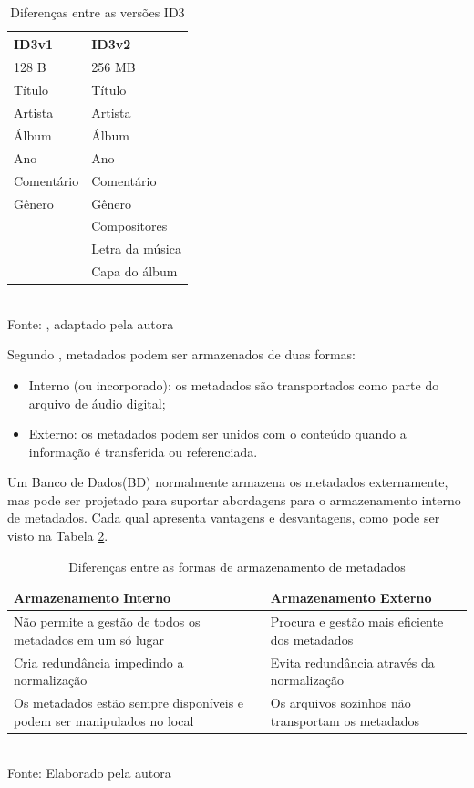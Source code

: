 \begin{table}[ht]
    \centering
    \caption{Diferenças entre as versões ID3}
    \begin{tabular}{p{4cm}|p{4cm}}
    \hline
        ID3v1 & ID3v2 \\
    \hline
        128 B & 256 MB \\
    \hline
        Título & Título \\
    \hline
        Artista & Artista \\
    \hline
        Álbum & Álbum \\
    \hline
        Ano & Ano \\
    \hline
        Comentário & Comentário \\
    \hline
        Gênero & Gênero \\
    \hline
         & Compositores \\
    \hline
         & Letra da música \\
    \hline
         & Capa do álbum \\
    \hline
    \end{tabular}
    \label{tab:diferencasId3}
    \\Fonte: \cite{ferreira2015}, adaptado pela autora
\end{table}

Segundo , metadados podem ser armazenados de duas formas:

\begin{itemize}
    \item Interno (ou incorporado): os metadados são transportados como parte do arquivo de áudio digital;
    \item Externo: os metadados podem ser unidos com o conteúdo quando a informação é transferida ou referenciada.
\end{itemize}

Um Banco de Dados(BD)  normalmente armazena os metadados externamente, mas pode ser projetado para suportar abordagens para o armazenamento interno de metadados. Cada qual apresenta vantagens e desvantagens, como pode ser visto na Tabela \ref{tab:diferencasArmazenamentoMetadados}.

\begin{table}[ht]
    \centering
    \caption{Diferenças entre as formas de armazenamento de metadados}
    \begin{tabular}{p{5cm}|p{5cm}}
    \hline
        Armazenamento Interno & Armazenamento Externo \\
    \hline
        Não permite a gestão de todos os metadados em um só lugar & Procura e gestão mais eficiente dos metadados \\
    \hline
        Cria redundância impedindo a normalização & Evita redundância através da normalização \\
    \hline
        Os metadados estão sempre disponíveis e podem ser manipulados no local & Os arquivos sozinhos não transportam os metadados \\
    \hline
    \end{tabular}
    \label{tab:diferencasArmazenamentoMetadados}
    \\Fonte: Elaborado pela autora
\end{table}

